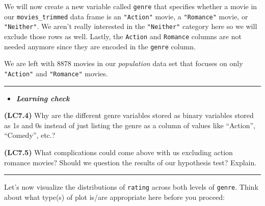 \documentclass[]{tufte-book}
\newenvironment{Shaded}{\begin{snugshade}}{\end{snugshade}}
\newcommand{\KeywordTok}[1]{\textcolor[rgb]{0.13,0.29,0.53}{\textbf{{#1}}}}
\newcommand{\DataTypeTok}[1]{\textcolor[rgb]{0.13,0.29,0.53}{{#1}}}
\newcommand{\DecValTok}[1]{\textcolor[rgb]{0.00,0.00,0.81}{{#1}}}
\newcommand{\StringTok}[1]{\textcolor[rgb]{0.31,0.60,0.02}{{#1}}}
\newcommand{\NormalTok}[1]{{#1}}
\let\oldrule=\rule
\renewcommand{\rule}[1]{\oldrule{\linewidth}}
\newenvironment{rmdblock}[1]
  {\begin{shaded*}
  \begin{itemize}
  \renewcommand{\labelitemi}{
    \raisebox{-.7\height}[0pt][0pt]{
    }
  }
  \item
  }
  {
  \end{itemize}
  \end{shaded*}
  }
\newenvironment{learncheck}
  {\begin{rmdblock}{warning}}
  {\end{rmdblock}}
\begin{document}
We will now create a new variable called \texttt{genre} that specifies
whether a movie in our \texttt{movies\_trimmed} data frame is an
\texttt{"Action"} movie, a \texttt{"Romance"} movie, or
\texttt{"Neither"}. We aren't really interested in the
\texttt{"Neither"} category here so we will exclude those rows as well.
Lastly, the \texttt{Action} and \texttt{Romance} columns are not needed
anymore since they are encoded in the \texttt{genre} column.

\begin{Shaded}
\end{Shaded}

We are left with 8878 movies in our \emph{population} data set that
focuses on only \texttt{"Action"} and \texttt{"Romance"} movies.

\begin{center}\rule{0.5\linewidth}{\linethickness}\end{center}

\begin{learncheck}
\textbf{\emph{Learning check}}
\end{learncheck}

\textbf{(LC7.4)} Why are the different genre variables stored as binary
variables stored as 1s and 0s instead of just listing the genre as a
column of values like ``Action'', ``Comedy'', etc.?

\textbf{(LC7.5)} What complications could come above with us excluding
action romance movies? Should we question the results of our hypothesis
test? Explain.

\begin{center}\rule{0.5\linewidth}{\linethickness}\end{center}

Let's now visualize the distributions of \texttt{rating} across both
levels of \texttt{genre}. Think about what type(s) of plot is/are
appropriate here before you proceed:
\end{document}
